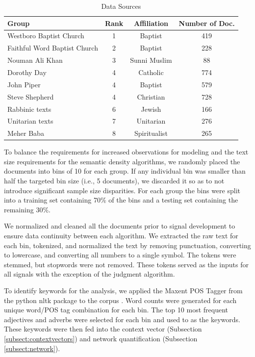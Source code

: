 \documentclass[11pt, a4paper]{article}
\begin{document}
\begin{table}[!h]
\caption{Data Sources}
\begin{center}
\begin{tabular}{lccc}
 \\  \hline
Group & Rank & Affiliation & Number of Doc.  \\ \hline
Westboro Baptist Church 		& 1 & Baptist		& 419 \\
Faithful Word Baptist Church	& 2 & Baptist		& 228 \\
Nouman Ali Khan			& 3 & Sunni Muslim	& 88 \\
Dorothy Day				& 4 & Catholic		& 774 \\
John Piper				& 4 & Baptist		& 579 \\
Steve Shepherd			& 4 & Christian		& 728 \\
Rabbinic texts				& 6 & Jewish		& 166 \\
Unitarian texts				& 7 & Unitarian		& 276 \\ 
Meher Baba				& 8 & Spiritualist	& 265 \\	

\end{tabular}
\end{center}
\label{table:data}
\end{table}

To balance the requirements for increased observations for modeling and the text size requirements for the semantic density algorithms, we randomly placed the documents into bins of 10 for each group. If any individual bin was smaller than half the targeted bin size (i.e., 5 documents), we discarded it so as to not introduce significant sample size disparities. For each group the bins were split into a training set containing 70\% of the bins and a testing set containing the remaining 30\%. 

We normalized and cleaned all the documents prior to signal development to ensure data continuity between each algorithm. We extracted the raw text for each bin, tokenized,  and normalized the text by removing punctuation, converting to lowercase, and converting all numbers to a single symbol. The tokens were stemmed, but stopwords were not removed. These tokens served as the inputs for all signals with the exception of the judgment algorithm.

To identify keywords for the analysis, we applied the Maxent POS Tagger from the python nltk package to the corpus \cite{loper2002}. Word counts were generated for each unique word/POS tag combination for each bin. The top 10 most frequent adjectives and adverbs were selected for each bin and used to as the keywords. These keywords were then fed into the context vector (Subsection \ref{subsect:contextvectors}) and network quantification (Subsection \ref{subsect:network}). 
\end{document}
